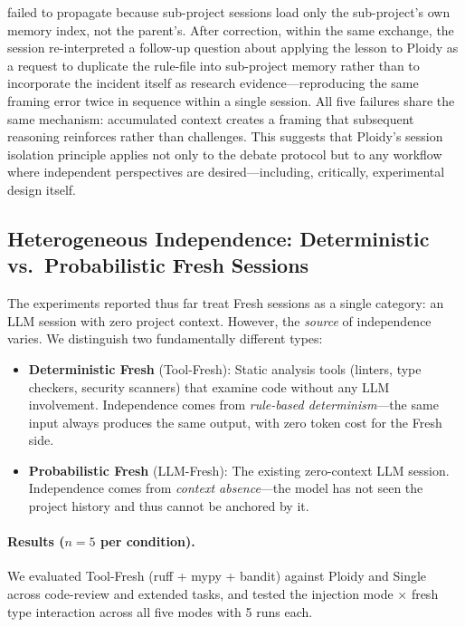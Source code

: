 \documentclass[11pt]{article}
\begin{document}
failed to propagate because sub-project sessions load only the sub-project's own memory index, not the parent's. After correction, within the same exchange, the session re-interpreted a follow-up question about applying the lesson to Ploidy as a request to duplicate the rule-file into sub-project memory rather than to incorporate the incident itself as research evidence---reproducing the same framing error twice in sequence within a single session. All five failures share the same mechanism: accumulated context creates a framing that subsequent reasoning reinforces rather than challenges. This suggests that Ploidy's session isolation principle applies not only to the debate protocol but to any workflow where independent perspectives are desired---including, critically, experimental design itself.

\subsection{Heterogeneous Independence: Deterministic vs.\ Probabilistic Fresh Sessions}
\label{sec:heterogeneous}

The experiments reported thus far treat Fresh sessions as a single category: an LLM session with zero project context. However, the \emph{source} of independence varies. We distinguish two fundamentally different types:

\begin{itemize}[leftmargin=1.5em]
  \item \textbf{Deterministic Fresh} (Tool-Fresh): Static analysis tools (linters, type checkers, security scanners) that examine code without any LLM involvement. Independence comes from \emph{rule-based determinism}---the same input always produces the same output, with zero token cost for the Fresh side.
  \item \textbf{Probabilistic Fresh} (LLM-Fresh): The existing zero-context LLM session. Independence comes from \emph{context absence}---the model has not seen the project history and thus cannot be anchored by it.
\end{itemize}

\paragraph{Results ($n{=}5$ per condition).} We evaluated Tool-Fresh (ruff + mypy + bandit) against Ploidy and Single across code-review and extended tasks, and tested the injection mode $\times$ fresh type interaction across all five modes with 5 runs each.
\end{document}
